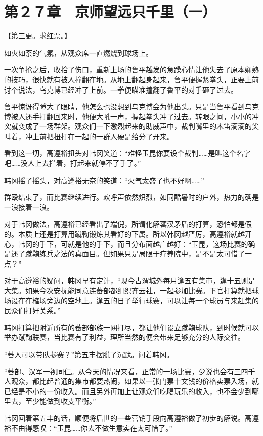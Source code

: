 \section{第２７章　京师望远只千里（一）}

【第三更。求红票。】

如火如荼的气氛，从观众席一直燃烧到球场上。

一次争抢之后，收拾了伤口，重新上场的鲁平越发的急躁心情让他失去了原本娴熟的技巧，很快就有被人撞翻在地。从地上翻起身起来，鲁平便握紧拳头，正要上前讨个说法，乌克博已经冲了上前。一拳便瞄准撞翻了鲁平的对手砸了过去。

鲁平惊讶得瞪大了眼睛，他怎么也没想到乌克博会为他出头。只是当鲁平看到乌克博被人还手打翻回来时，他便大吼一声，握起拳头冲了过去。转眼之间，小小的冲突就变成了一场群架。观众们一下激烈起来的助威声中，裁判嘴里的木笛滴滴的尖叫着，冲上前把扭打在一起的一群人硬是给分了开来。

看到这一切，高遵裕扭头对韩冈笑道：“难怪玉昆你要设个裁判……是叫这个名字吧……没人上去拦着，打起来就停不了手了。”

韩冈摇了摇头，对高遵裕无奈的笑道：“火气太盛了也不好啊……”

群殴结束了，而比赛继续进行。欢呼声依然炽烈，如同酷暑时的户外，热力的确是一浪接着一浪。

对于韩冈做法，高遵裕已经看出了端倪，所谓化解蕃汉矛盾的打算，恐怕都是假的。本质上还是打算用蹴鞠锻炼其看好的下属。所以韩冈越严厉，高遵裕就越开心，韩冈的手下，可就是他的手下，而且分布面越广越好：“玉昆，这场比赛的确是还了蹴鞠练兵之法的真面目。但如果只是局限于疗养院中，是不是太可惜了一点？”

对于高遵裕的疑问，韩冈早有定计，“现今古渭城外每月逢五有集市，逢十五则是大集。如果今次安抚能同意连蕃部都组织齐云社，一起参加比赛。下官打算就把球场设在在榷场旁边的空地上。逢五的日子举行球赛，可以让每一个球员与来赶集的民众们打好关系。”

韩冈打算把附近所有的蕃部部族一网打尽，都让他们设立蹴鞠球队，到时候就可以举办蹴鞠联赛，当比赛有了利益，理所当然的便会带来足够充分的人际交往。

“蕃人可以带队参赛？”第五丰摆脱了沉默。问着韩冈。

“蕃部、汉军一视同仁。从今天的情况来看，正常的一场比赛，少说也会有三四千人观众，都比起普通的集市都要热闹，如果以一张门票十文钱的价格卖票入场，就已经是不小的一份收入。而且另外再加上让观众们吃喝玩乐的收入，也不会少到哪里去，至少能做到收支平衡。”

韩冈回着第五丰的话，顺便将后世的一些营销手段向高遵裕做了初步的解说。高遵裕不由得感叹：“玉昆……你去不做生意实在太可惜了。”

